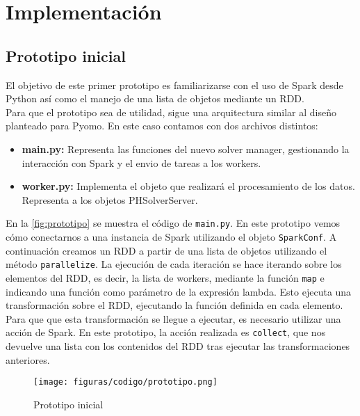 \chapter{Implementación}

\section{Prototipo inicial}


El objetivo de este primer prototipo es familiarizarse con el uso de Spark desde Python así como el manejo de una lista de objetos mediante un RDD.\\

Para que el prototipo sea de utilidad, sigue una arquitectura similar al diseño planteado para Pyomo. En este caso contamos con dos archivos distintos:

\begin{itemize}
    \item \textbf{main.py: } Representa las funciones del nuevo solver manager, gestionando la interacción con Spark y el envio de tareas a los workers.
    \item \textbf{worker.py: } Implementa el objeto que realizará el procesamiento de los datos. Representa a los objetos PHSolverServer.
\end{itemize}

En la \autoref{fig:prototipo} se muestra el código de \texttt{main.py}. En este prototipo vemos cómo conectarnos a una instancia de Spark utilizando el objeto \texttt{SparkConf}. A continuación creamos un RDD a partir de una lista de objetos utilizando el método \texttt{parallelize}.
La ejecución de cada iteración se hace iterando sobre los elementos del RDD, es decir, la lista de workers, mediante la función \texttt{map} e indicando una función como parámetro de la expresión lambda. Esto ejecuta una transformación sobre el RDD, ejecutando la función definida en cada elemento. 
Para que que esta transformación se llegue a ejecutar, es necesario utilizar una acción de Spark. En este prototipo, la acción realizada es \texttt{collect}, que nos devuelve una lista con los contenidos del RDD tras ejecutar las transformaciones anteriores.\\

\begin{figure}[]
    \centerline{\texttt{[image: figuras/codigo/prototipo.png]}}
    \caption{Prototipo inicial}
    \label{fig:prototipo}
\end{figure}

